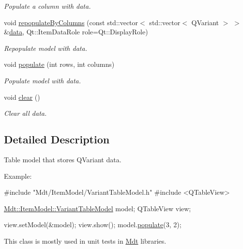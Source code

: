 \begin{DoxyCompactItemize}
\begin{DoxyCompactList}\small\item\em Populate a column with data. \end{DoxyCompactList}\item 
void \hyperlink{class_mdt_1_1_item_model_1_1_variant_table_model_af55fafebf9aa4f5ee6d5266792823653}{repopulate\+By\+Columns} (const std\+::vector$<$ std\+::vector$<$ Q\+Variant $>$ $>$ \&\hyperlink{class_mdt_1_1_item_model_1_1_variant_table_model_a88bb1b4c736812bfd14e9008923c39a4}{data}, Qt\+::\+Item\+Data\+Role role=Qt\+::\+Display\+Role)
\begin{DoxyCompactList}\small\item\em Repopulate model with data. \end{DoxyCompactList}\item 
void \hyperlink{class_mdt_1_1_item_model_1_1_variant_table_model_af9db809e602bc61d218245c605e3473b}{populate} (int rows, int columns)
\begin{DoxyCompactList}\small\item\em Populate model with data. \end{DoxyCompactList}\item 
void \hyperlink{class_mdt_1_1_item_model_1_1_variant_table_model_ad1a16af9a0840d48f9b160407adf1c1b}{clear} ()
\begin{DoxyCompactList}\small\item\em Clear all data. \end{DoxyCompactList}\end{DoxyCompactItemize}


\subsection{Detailed Description}
Table model that stores Q\+Variant data. 

Example\+: 
\begin{DoxyCode}
\textcolor{preprocessor}{#include "Mdt/ItemModel/VariantTableModel.h"}
\textcolor{preprocessor}{#include <QTableView>}

\hyperlink{class_mdt_1_1_item_model_1_1_variant_table_model}{Mdt::ItemModel::VariantTableModel} model;
QTableView view;

view.setModel(&model);
view.show();
model.\hyperlink{class_mdt_1_1_item_model_1_1_variant_table_model_af9db809e602bc61d218245c605e3473b}{populate}(3, 2);
\end{DoxyCode}


This class is mostly used in unit tests in \hyperlink{namespace_mdt}{Mdt} libraries. 

